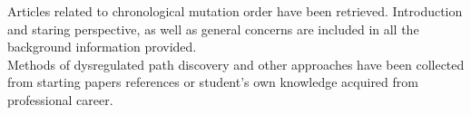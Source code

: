 Articles related to chronological mutation order have been retrieved. Introduction and staring perspective, as well as general concerns are included in all the background information provided.
\\

Methods of dysregulated path discovery and other approaches have been collected from starting papers references or student’s own knowledge acquired from professional career.